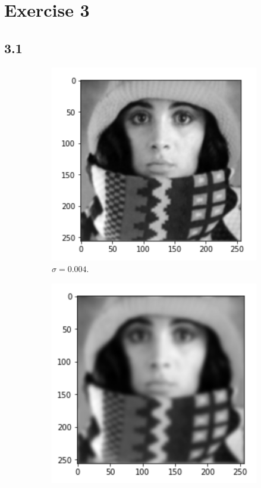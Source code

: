 \section{Exercise 3}
\subsection*{3.1}
\begin{figure}[H]
	\centering
	\begin{subfigure}[b]{0.45\textwidth}
		\centering
		\includegraphics[width=\textwidth]{Materials/004}
		\caption{$\sigma = 0.004$.}
	\end{subfigure}
	\hfill
	\begin{subfigure}[b]{0.45\textwidth}
		\centering
		\includegraphics[width=\textwidth]{Materials/01}

\end{subfigure}
\end{figure}
